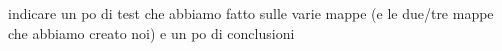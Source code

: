     indicare un po di test che abbiamo fatto sulle varie mappe (e le due/tre mappe che abbiamo creato noi) e un po di conclusioni
    

